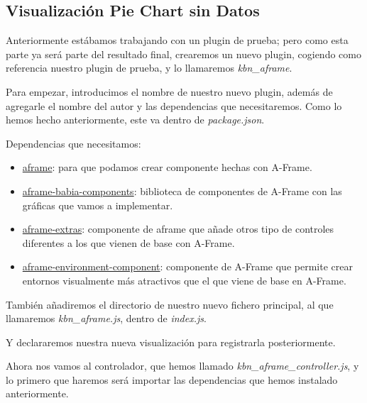 \documentclass[a4paper, 12pt]{book}
\begin{document}
\subsection{Visualización Pie Chart sin Datos}
\label{sec:piewithoutdata}

Anteriormente estábamos trabajando con un plugin de prueba; pero como esta parte ya será parte del resultado final, crearemos un nuevo plugin, cogiendo como referencia nuestro plugin de prueba, y lo llamaremos \textit{kbn\_aframe}.

Para empezar, introducimos el nombre de nuestro nuevo plugin, además de agregarle el nombre del autor y las dependencias que necesitaremos. Como lo hemos hecho anteriormente, este va dentro de \textit{package.json}.



Dependencias que necesitamos:
\begin{itemize}
    \item \underline{aframe}: para que podamos crear componente hechas con A-Frame.
    \item \underline{aframe-babia-components}: biblioteca de componentes de A-Frame con las gráficas que vamos a implementar.
    \item \underline{aframe-extras}: componente de aframe que añade otros tipo de controles diferentes a los que vienen de base con A-Frame.
    \item \underline{aframe-environment-component}: componente de A-Frame que permite crear entornos visualmente más atractivos que el que viene de base en A-Frame.
\end{itemize}

También añadiremos el directorio de nuestro nuevo fichero principal, al que llamaremos \textit{kbn\_aframe.js}, dentro de \textit{index.js}.



Y declararemos nuestra nueva visualización para registrarla posteriormente.



Ahora nos vamos al controlador, que hemos llamado \textit{kbn\_aframe\_controller.js}, y lo primero que haremos será importar las dependencias que hemos instalado anteriormente.


\end{document}
